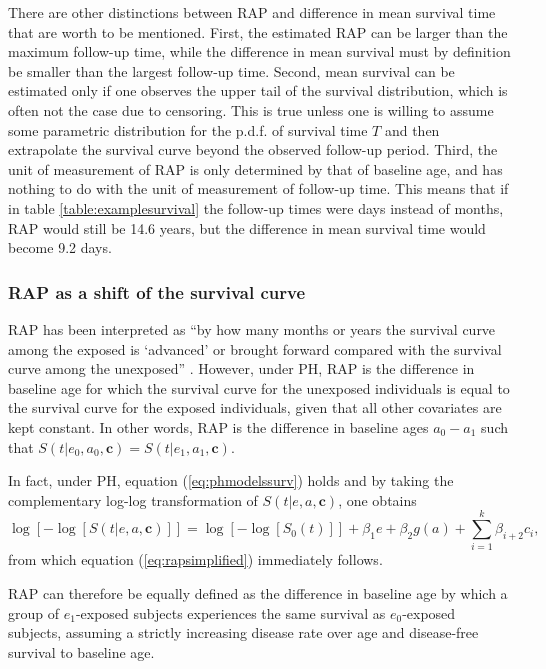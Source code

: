 There are other distinctions between RAP and difference in mean survival time that are worth to be mentioned. First, the estimated RAP can be larger than the maximum follow-up time, while the difference in mean survival must by definition be smaller than the largest follow-up time. Second, mean survival can be estimated only if one observes the upper tail of the survival distribution, which is often not the case due to censoring. This is true unless one is willing to assume some parametric distribution for the p.d.f. of survival time $T$ and then extrapolate the survival curve beyond the observed follow-up period. Third, the unit of measurement of RAP is only determined by that of baseline age, and has nothing to do with the unit of measurement of follow-up time. This means that if in table \ref{table:examplesurvival} the follow-up times were days instead of months,  RAP would still be 14.6 years, but the difference in mean survival time would become 9.2 days.


\subsubsection{RAP as a shift of the survival curve}

RAP has been interpreted as ``by how many months or years the survival curve among the exposed is `advanced' or brought forward compared with the survival curve among the unexposed'' \citep{brunekreef_brave_2007}. However, under PH, RAP is the difference in baseline age for which the survival curve for the unexposed individuals is equal to the survival curve for the exposed individuals, given that all other covariates are kept constant. In other words, RAP is the difference in baseline ages $a_0-a_1$ such that $S(t|e_0,a_0,\textbf{c})=S(t|e_1,a_1,\textbf{c})$. 

In fact, under PH, equation (\ref{eq:phmodelssurv}) holds and by taking the complementary log-log transformation of $S(t|e,a,\mathbf{c})$, one obtains
\begin{equation*}
\log \left[-\log\left[S(t|e,a,\mathbf{c})\right]\right]=\log\left[-\log\left[S_0(t)\right]\right] + \beta_1 e + \beta_2  g(a) + \sum_{i=1}^k \beta_{i+2}  c_i,
\end{equation*}
from which equation (\ref{eq:rapsimplified}) immediately follows. 

RAP can therefore be equally defined as the difference in baseline age by which a group of \mbox{$e_1$-exposed} subjects experiences the same survival as $e_0$-exposed subjects, assuming a strictly increasing disease rate over age and disease-free survival to baseline age.


